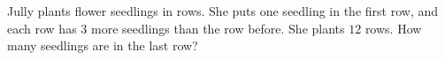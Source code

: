 Jully plants flower seedlings in rows. She puts one seedling in the first row, and each row has $3$ more seedlings than the row before. She plants $12$ rows. How many seedlings are in the last row?
